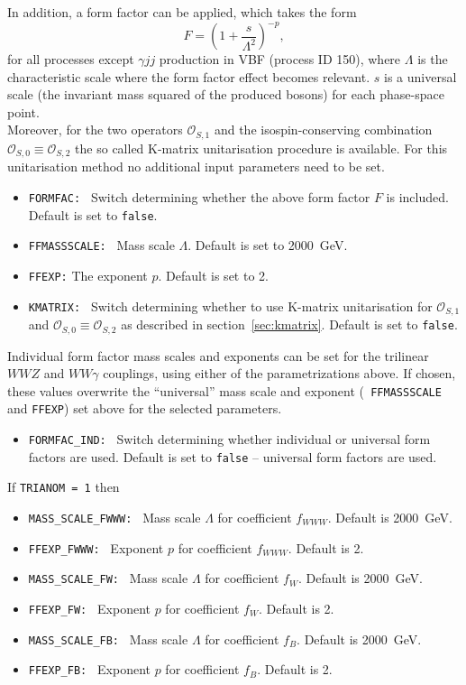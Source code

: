 \documentclass[english,12pt]{article}
\begin{document}
In addition, a form factor can be applied, which takes the form
\begin{equation}
 F = \left(1 + \frac{s}{\Lambda^{2}} \right)^{-p},
\end{equation}
for all processes except $\gamma jj$ production in VBF (process ID 150),
where $\Lambda$ is the characteristic scale where the form factor effect becomes relevant.  $s$ is a universal scale (the
invariant mass squared of the produced bosons) for each phase-space point.\\
Moreover, for the two operators $\mathcal{O}_{S,1}$ and the isospin-conserving combination $\mathcal{O}_{S,0}\equiv\mathcal{O}_{S,2}$ the
so called K-matrix unitarisation procedure is available. For this unitarisation
method no additional input parameters need to be set. 
\begin{itemize}
 \item {\tt FORMFAC: }  Switch determining whether the above form factor $F$ is
included.  Default is set to {\tt false}.
 \item {\tt FFMASSSCALE: } Mass scale $\Lambda$.  Default is set to 2000~GeV.
 \item {\tt FFEXP:} The exponent $p$.  Default is set to 2.
 \item {\tt KMATRIX: }  Switch determining whether to use K-matrix unitarisation
       for $\mathcal{O}_{S,1}$ and $\mathcal{O}_{S,0}\equiv\mathcal{O}_{S,2}$
       as described in section~\ref{sec:kmatrix}. Default is set to
       {\tt false}.
\end{itemize}
Individual form factor mass scales and exponents can be set for the trilinear
$WWZ$ and $WW\gamma$ couplings, using either of the parametrizations above.  If
chosen, these values overwrite the ``universal'' mass scale and exponent ({\tt
FFMASSSCALE} and {\tt FFEXP}) set above for the selected parameters.
\begin{itemize}
 \item {\tt FORMFAC\_IND: } Switch determining whether individual or universal
form factors are used.  Default is set to {\tt false} -- universal form factors are used.
\end{itemize}
If {\tt TRIANOM = 1} then
\begin{itemize}
 \item {\tt MASS\_SCALE\_FWWW: } Mass scale $\Lambda$ for coefficient $f_{WWW}$.
 Default is 2000~GeV.
 \item {\tt FFEXP\_FWWW: } Exponent $p$ for coefficient $f_{WWW}$.  Default is 2.
 \item {\tt MASS\_SCALE\_FW: } Mass scale $\Lambda$ for coefficient $f_{W}$. 
Default is 2000~GeV.
 \item {\tt FFEXP\_FW: } Exponent $p$ for coefficient $f_{W}$.  Default is 2.
 \item {\tt MASS\_SCALE\_FB: } Mass scale $\Lambda$ for coefficient $f_{B}$. 
Default is 2000~GeV.
 \item {\tt FFEXP\_FB: } Exponent $p$ for coefficient $f_{B}$.  Default is 2.
\end{itemize}
\end{document}
